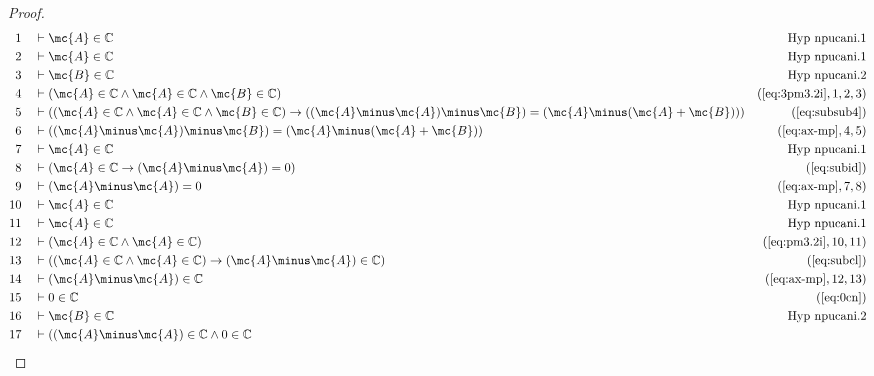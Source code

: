 \begin{proof}
\begin{align}
  1 &&  & \vdash \mc{A} \in \mathbb{C}&\text{Hyp~npucani.1}\notag%
  \\ 2 &&  & \vdash \mc{A} \in \mathbb{C}&\text{Hyp~npucani.1}\notag%
  \\ 3 &&  & \vdash \mc{B} \in \mathbb{C}&\text{Hyp~npucani.2}\notag%
  \\ 4 &&  & \vdash ( \mc{A} \in \mathbb{C} \wedge \mc{A} \in \mathbb{C} \wedge \mc{B} \in
     \mathbb{C} )&(\mbox{\ref{eq:3pm3.2i}},1,2,3)\notag
  \\ 5 &&  & \vdash ( ( \mc{A} \in \mathbb{C} \wedge \mc{A} \in \mathbb{C} \wedge \mc{B} \in
     \mathbb{C} ) \rightarrow ( ( \mc{A} \minus \mc{A} ) \minus \mc{B} )
     = ( \mc{A} \minus ( \mc{A} + \mc{B} ) )
     )&(\mbox{\ref{eq:subsub4}})\notag
  \\ 6 &&  & \vdash ( ( \mc{A} \minus \mc{A} ) \minus \mc{B} ) = ( \mc{A} \minus ( \mc{A} + \mc{B} )
     )&(\mbox{\ref{eq:ax-mp}},4,5)\notag
  \\ 7 &&  & \vdash \mc{A} \in \mathbb{C}&\text{Hyp~npucani.1}\notag%
  \\ 8 &&  & \vdash ( \mc{A} \in \mathbb{C} \rightarrow ( \mc{A} \minus \mc{A} ) = 0
     )&(\mbox{\ref{eq:subid}})\notag
  \\ 9 &&  & \vdash ( \mc{A} \minus \mc{A} ) = 0&(\mbox{\ref{eq:ax-mp}},7,8)\notag
  \\ 10 &&  & \vdash \mc{A} \in \mathbb{C}&\text{Hyp~npucani.1}\notag%
  \\ 11 &&  & \vdash \mc{A} \in \mathbb{C}&\text{Hyp~npucani.1}\notag%
  \\ 12 &&  & \vdash ( \mc{A} \in \mathbb{C} \wedge \mc{A} \in \mathbb{C}
     )&(\mbox{\ref{eq:pm3.2i}},10,11)\notag
  \\ 13 &&  & \vdash ( ( \mc{A} \in \mathbb{C} \wedge \mc{A} \in \mathbb{C} ) \rightarrow
     ( \mc{A} \minus \mc{A} ) \in \mathbb{C}
     )&(\mbox{\ref{eq:subcl}})\notag
  \\ 14 &&  & \vdash ( \mc{A} \minus \mc{A} ) \in
     \mathbb{C}&(\mbox{\ref{eq:ax-mp}},12,13)\notag
  \\ 15 &&  & \vdash 0 \in \mathbb{C}&(\mbox{\ref{eq:0cn}})\notag
  \\ 16 &&  & \vdash \mc{B} \in \mathbb{C}&\text{Hyp~npucani.2}\notag%
  \\ 17 &&  & \vdash ( ( \mc{A} \minus \mc{A} ) \in \mathbb{C} \wedge 0 \in \mathbb{C}

\end{align}
\end{proof}

